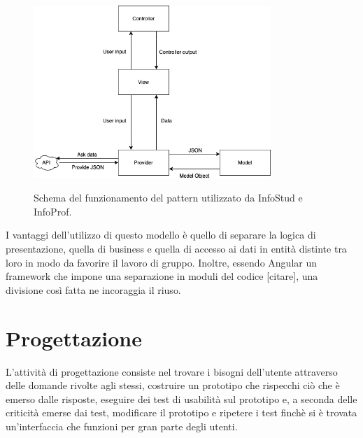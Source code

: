 \documentclass[Lau, oneside, noexaminfo]{sapthesis}%
\begin{document}
\begin{figure}[H]
	\caption{Schema del funzionamento del pattern utilizzato da InfoStud e InfoProf.}
	\centering
	\includegraphics[width=0.8\textwidth]{arch-pattern-img}
	\label{fig:pattern}
\end{figure}

I vantaggi dell'utilizzo di questo modello è quello di separare la logica di presentazione, quella di business e quella di accesso ai dati in entità distinte tra loro in modo da favorire il lavoro di gruppo. Inoltre, essendo Angular un framework che impone una separazione in moduli del codice [citare], una divisione così fatta ne incoraggia il riuso.


\chapter{Progettazione}
\label{ch:3}

L'attività di progettazione consiste nel trovare i bisogni dell'utente attraverso delle domande rivolte agli stessi, costruire un prototipo che rispecchi ciò che è emerso dalle risposte, eseguire dei test di usabilità sul prototipo e, a seconda delle criticità emerse dai test, modificare il prototipo e ripetere i test finchè si è trovata un'interfaccia che funzioni per gran parte degli utenti.
\end{document}
